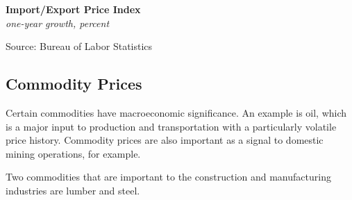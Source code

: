 \documentclass{report}
\makeatletter
\newcommand{\tbllink}[1]{\href{https://raw.githubusercontent.com/bdecon/US-chartbook/master/chartbook/data/#1}{\faTable}}
\newcommand*\short[1]{\expandafter\@gobbletwo\number\numexpr#1\relax}
\newcommand{\dateaxisticks}{
		date coordinates in=x, axis line style={draw=none},
		xmax={2022-10-31},
		max space between ticks=40,	    
		xtick={{1990-01-01}, {1992-01-01}, {1994-01-01}, 
			{1996-01-01}, {1998-01-01}, {2000-01-01}, 
			{2002-01-01}, {2004-01-01}, {2006-01-01},
			{2008-01-01}, {2010-01-01}, {2012-01-01}, {2014-01-01},
		    {2016-01-01}, {2018-01-01}, {2020-01-01}, {2022-01-01}, 
		    {2024-01-01}, {2026-01-01}},
		minor xtick={{1989-01-01}, {1991-01-01}, {1993-01-01},
			{1995-01-01}, {1997-01-01}, {1999-01-01}, 
			{2001-01-01}, {2003-01-01}, {2005-01-01}, {2007-01-01},
		    {2009-01-01}, {2011-01-01}, {2013-01-01}, {2015-01-01},
		    {2017-01-01}, {2019-01-01}, {2021-01-01}, {2023-01-01}, 
		    {2025-01-01}, {2027-01-01}},
		enlarge y limits={0.06}, enlarge x limits={0.01},
		}
\newcommand{\bbar}[2]{extra #1 ticks = {{#2}}, extra #1 tick labels = ,
		extra #1 tick style = {grid=major, grid style={thick, black!25}},}
\newcommand{\stdline}[4]{\addplot[very thick, no markers, color=#1] 
		table [x=#2, y=#3, col sep=comma] {#4};	}
\newcommand{\rbars}{
		\fill[color=black!10] (axis cs:{1990-07-01},\pgfkeysvalueof{/pgfplots/ymin}) rectangle 
			(axis cs:{1991-03-01}, \pgfkeysvalueof{/pgfplots/ymax});
		\fill[color=black!10] (axis cs:{2007-12-01},\pgfkeysvalueof{/pgfplots/ymin}) rectangle 
			(axis cs:{2009-07-01}, \pgfkeysvalueof{/pgfplots/ymax});
		\fill[color=black!10] (axis cs:{2001-03-01},\pgfkeysvalueof{/pgfplots/ymin}) rectangle 
			(axis cs:{2001-11-01}, \pgfkeysvalueof{/pgfplots/ymax});
		\fill[color=black!10] (axis cs:{2020-02-01},\pgfkeysvalueof{/pgfplots/ymin}) rectangle 
			(axis cs:{2020-05-01}, \pgfkeysvalueof{/pgfplots/ymax});}
\makeatother
\begin{document}
{\begin{minipage}{0.76\textwidth}
\normalsize \textbf{Import/Export Price Index}\\
\footnotesize{\textit{one-year growth, percent}}\\
\vspace{2.8cm}

\hspace{4mm} 
\vspace{1mm}

\footnotesize{Source: Bureau of Labor Statistics} \hfill \tbllink{mxpi.csv}
\vspace{2mm}

\hypertarget{prco}{}
\subsection*{Commodity Prices}
\vspace*{-1mm}

\small Certain commodities have macroeconomic significance. An example is oil, which is a major input to production and transportation with a particularly volatile price history. Commodity prices are also important as a signal to domestic mining operations, for example. 

Two commodities that are important to the construction and manufacturing industries are lumber and steel.  
\vspace{2mm}


\end{minipage}}
\end{document}
